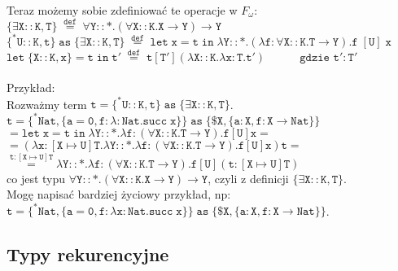 \documentclass[11pt,leqno]{article}
\begin{document}
Teraz możemy sobie zdefiniować te operacje w $F_\omega$: \\
$\mathtt{\{\exists X::K,T\}\;\overset{def}{=}\;\forall Y::\ast.(\forall X::K.X \rightarrow Y) \rightarrow Y}$ \\
$\mathtt{\{^*U::K,t\}\;as\; \{\exists X::K,T\}\; \overset{def}{=} \;let\;x=t\;in\;\lambda Y::\ast.(\lambda f:\forall X::K.T \rightarrow Y) .f\;[U]\;x}$ \\
$\mathtt{let\;\{X::K,x\}=t\;in\;t'\;\overset{def}{=}\;t[T'](\lambda X::K.\lambda x:T.t')\hspace{3em} \text{gdzie $\mathtt{t':T'}$} }$ \\ \\

Przykład: \\
Rozważmy term $\mathtt{ t=\{^*U::K,t\}\;as\; \{\exists X::K,T\}}$. \\ 
$ \mathtt{ t=\{^*Nat,\{a=0, f:\lambda:Nat.succ\;x\}\}\;as\;\{\$X, \{a:X, f:X \rightarrow Nat\}\} }$ \\ 
$ \mathtt{ = let\;x=t\;in\;\lambda Y::\ast.\lambda f:(\forall X::K.T \rightarrow Y).f[U]x = }$ \\
$ \mathtt{ = (\lambda x:[X \mapsto U]T.\lambda Y::\ast.\lambda f:(\forall X::K.T \rightarrow Y).f[U]x)t = }$ \\
$ \mathtt{ \overset{t:[X \mapsto U]T}{=} \lambda Y::\ast.\lambda f:(\forall X::K.T \rightarrow Y).f[U](t:[X \mapsto U]T)}$ \\
co jest typu $\mathtt{\forall Y::\ast.(\forall X::K.X \rightarrow Y) \rightarrow Y}$, czyli z definicji $\mathtt{\{\exists X::K,T\}}$. \\

Mogę napisać bardziej życiowy przykład, np: \\ 
$\mathtt{ t=\{^*Nat,\{a=0, f:\lambda x:Nat.succ\;x\}\}\;as\;\{\$X, \{a:X, f:X \rightarrow Nat\}\}}$. \\ 



\subsection{Typy rekurencyjne}
\end{document}
